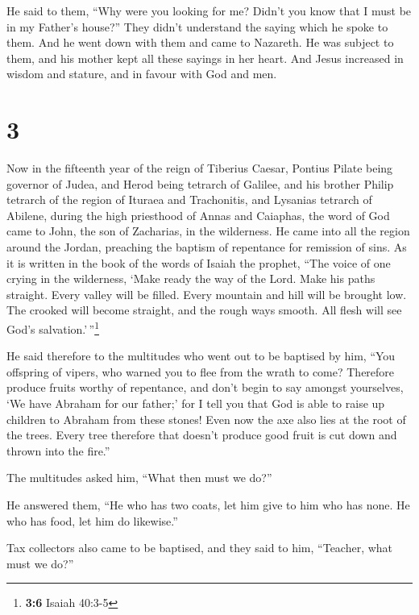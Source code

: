  He said to them, ``Why were you looking for me? Didn't
you know that I must be in my Father's house?''  They
didn't understand the saying which he spoke to them.  And
he went down with them and came to Nazareth. He was subject to them, and
his mother kept all these sayings in her heart.  And
Jesus increased in wisdom and stature, and in favour with God and men.

\hypertarget{section-2}{%
\section{3}\label{section-2}}

 Now in the fifteenth year of the reign of Tiberius
Caesar, Pontius Pilate being governor of Judea, and Herod being tetrarch
of Galilee, and his brother Philip tetrarch of the region of Ituraea and
Trachonitis, and Lysanias tetrarch of Abilene,  during the
high priesthood of Annas and Caiaphas, the word of God came to John, the
son of Zacharias, in the wilderness.  He came into all the
region around the Jordan, preaching the baptism of repentance for
remission of sins.  As it is written in the book of the
words of Isaiah the prophet, ``The voice of one crying in the
wilderness, `Make ready the way of the Lord. Make his paths straight.
 Every valley will be filled. Every mountain and hill will
be brought low. The crooked will become straight, and the rough ways
smooth.  All flesh will see God's
salvation.'\,''\footnote{\textbf{3:6} Isaiah 40:3-5}

 He said therefore to the multitudes who went out to be
baptised by him, ``You offspring of vipers, who warned you to flee from
the wrath to come?  Therefore produce fruits worthy of
repentance, and don't begin to say amongst yourselves, `We have Abraham
for our father;' for I tell you that God is able to raise up children to
Abraham from these stones!  Even now the axe also lies at
the root of the trees. Every tree therefore that doesn't produce good
fruit is cut down and thrown into the fire.''

 The multitudes asked him, ``What then must we do?''

 He answered them, ``He who has two coats, let him give
to him who has none. He who has food, let him do likewise.''

 Tax collectors also came to be baptised, and they said
to him, ``Teacher, what must we do?''


